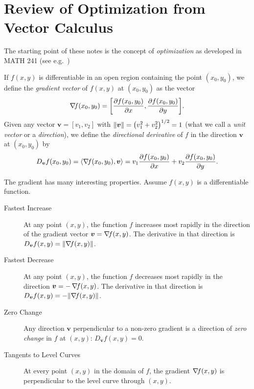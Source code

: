 
\chapter{Review of Optimization from Vector Calculus}\label{chapter:intro}

The starting point of these notes is the concept of \emph{optimization} as developed in MATH 241 (see e.g.~\cite[Chapter~14]{finney2001thomas})

\begin{definition}\label{def:gradient}
If $f(x,y)$ is differentiable in an open region containing the point $(x_0,y_0)$, we define the \emph{gradient vector} of $f(x,y)$ at $(x_0, y_0)$ as the vector 
\begin{equation*}
\mathop{\nabla\! {f}}(x_0, y_0) = \bigg[ \frac{\partial f(x_0, y_0)}{\partial x}, \frac{\partial f(x_0, y_0)}{\partial y} \bigg].
\end{equation*}
Given any vector $\boldsymbol{v} = [v_1, v_2]$ with $\lVert \boldsymbol{v} \rVert = \big( v_1^2+v_2^2\big)^{1/2}=1$ (what we call a \emph{unit vector} or a \emph{direction}), we define the \emph{directional derivative} of $f$ in the direction $\boldsymbol{v}$ at $(x_0, y_0)$ by
\begin{equation*}
D_{\boldsymbol{v}}f(x_0, y_0) = \langle \mathop{\nabla\! {f}}(x_0, y_0), \boldsymbol{v} \rangle = v_1 \frac{\partial f(x_0,y_0)}{\partial x} + v_2 \frac{\partial f(x_0,y_0)}{\partial y}.
\end{equation*}
\end{definition}

\begin{remark}
The gradient has many interesting properties.  Assume $f(x,y)$ is a differentiable function.
\begin{description}
\item[Fastest Increase] At any point $(x,y)$, the function $f$ increases most rapidly in the direction of the gradient vector $\boldsymbol{v} = \mathop{\nabla\! {f}}(x,y)$.  The derivative in that direction is $D_{\boldsymbol{v}}f(x,y) = \lVert \mathop{\nabla\! {f}}(x,y) \rVert$.
\item[Fastest Decrease] At any point $(x,y)$, the function $f$ decreases most rapidly in the direction $\boldsymbol{v} = -\mathop{\nabla\! {f}}(x,y)$.  The derivative in that direction is $D_{\boldsymbol{v}}f(x,y) = -\lVert \mathop{\nabla\! {f}}(x,y) \rVert$.
\item[Zero Change] Any direction $\boldsymbol{v}$ perpendicular to a non-zero gradient is a direction of \emph{zero change} in $f$ at $(x,y)$: $D_{\boldsymbol{v}}f(x,y) = 0$.
\item[Tangents to Level Curves] At every point $(x,y)$ in the domain of $f$, the gradient $\mathop{\nabla\! {f}}(x,y)$ is perpendicular to the level curve through $(x,y)$. 
\end{description}
\end{remark}

